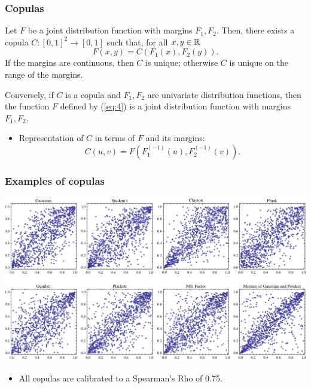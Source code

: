 \documentclass[10pt,mathserif]{beamer}
\renewcommand{\(}{\begin{columns}}
\renewcommand{\)}{\end{columns}}
\newcommand{\<}[1]{\begin{column}{#1}}
\renewcommand{\>}{\end{column}}
\theoremstyle{definition}
\begin{document}
\begin{frame}
  \frametitle{Copulas}
  \begin{theorem}
  Let $F$ be a joint distribution function with margins $F_1,
  F_2$. Then, there exists a copula $C:[0,1]^2\rightarrow[0,1]$ such
  that, for all $x,y\in {\mathbb{R}}$
  \begin{equation}
    \label{eq:4}
    F(x,y)=C(F_1(x), F_2(y)). 
  \end{equation}
  If the margins are continuous, then $C$ is unique; otherwise $C$ is
  unique on the range of the margins.

  Conversely, if $C$ is a copula and $F_1, F_2$ are univariate
  distribution functions, then the function $F$ defined by (\ref{eq:4})
  is a joint distribution function with margins $F_1, F_2$.
\end{theorem}
\begin{itemize}
  \addtolength{\itemsep}{1pt}
\item Representation of $C$ in terms of $F$ and its
  margins: 
  \begin{equation*}
    C(u,v) = F(F_1^{(-1)}(u), F_2^{(-1)}(v)). 
  \end{equation*}
  \vspace*{-1.1\baselineskip}
\end{itemize}
\end{frame}

\begin{frame}[label=copulas]
  \frametitle{Examples of copulas}
  \hspace*{-.75cm}\includegraphics[scale=.65]{../_pics/copulas_scatterplots.pdf}
  \vspace*{-\baselineskip}
  \begin{itemize}
  \item All copulas are calibrated to a Spearman's Rho of 0.75.
  \end{itemize}
\end{frame}
\end{document}

